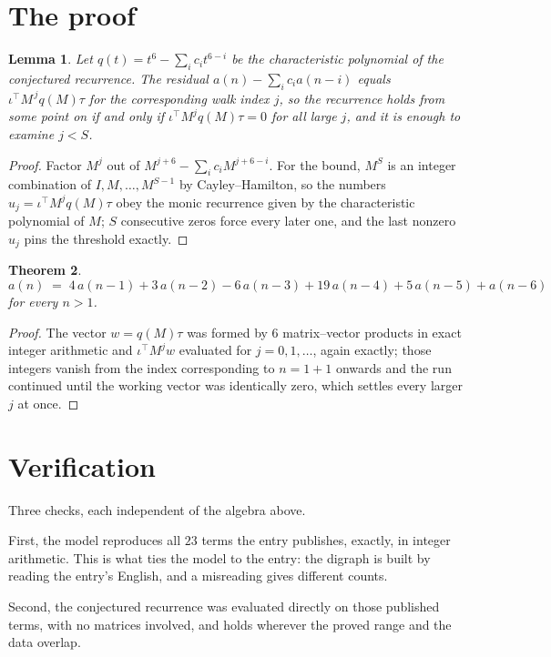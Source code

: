 \documentclass[11pt,a4paper]{article}
\theoremstyle{plain}
\newtheorem{theorem}{Theorem}
\newtheorem{lemma}[theorem]{Lemma}
\theoremstyle{definition}
\begin{document}
\section{The proof}

\begin{lemma}\label{lem:crit}
Let $q(t)=t^{6}-\sum_i c_it^{6-i}$ be the characteristic polynomial of the
conjectured recurrence. The residual $a(n)-\sum_ic_ia(n-i)$ equals
$\iota^{\!\top}M^{\,j}q(M)\tau$ for the corresponding walk index $j$, so the recurrence
holds from some point on if and only if $\iota^{\!\top}M^{j}q(M)\tau=0$ for all large $j$,
and it is enough to examine $j<S$.
\end{lemma}

\begin{proof}
Factor $M^{j}$ out of $M^{j+6}-\sum_ic_iM^{j+6-i}$. For the bound, $M^{S}$
is an integer combination of $I,M,\dots,M^{S-1}$ by Cayley--Hamilton, so the numbers
$u_j=\iota^{\!\top}M^{j}q(M)\tau$ obey the monic recurrence given by the characteristic
polynomial of $M$; $S$ consecutive zeros force every later one, and the last nonzero $u_j$
pins the threshold exactly.
\end{proof}

\begin{theorem}
\[
a(n)\;=\;4\,a(n-1) + 3\,a(n-2) - 6\,a(n-3) + 19\,a(n-4) + 5\,a(n-5) + a(n-6)
\]
for every $n>1$.
\end{theorem}

\begin{proof}
The vector $w=q(M)\tau$ was formed by $6$ matrix--vector products in exact integer
arithmetic and $\iota^{\!\top}M^{j}w$ evaluated for $j=0,1,\dots$, again exactly; those
integers vanish from the index corresponding to $n=1+1$ onwards and the run continued
until the working vector was identically zero, which settles every larger $j$ at once.
\end{proof}

\section{Verification}

Three checks, each independent of the algebra above.

First, the model reproduces all $23$ terms the entry publishes, exactly, in integer
arithmetic. This is what ties the model to the entry: the digraph is built by reading the
entry's English, and a misreading gives different counts.

Second, the conjectured recurrence was evaluated directly on those published terms, with no
matrices involved, and holds wherever the proved range and the data overlap.
\end{document}
